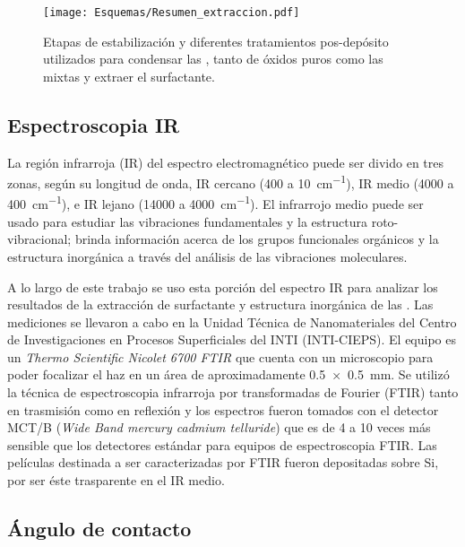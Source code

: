 				\begin{figure}[ht!]
						  \begin{center}
						  \texttt{[image: Esquemas/Resumen\_extraccion.pdf]}
						  \caption[Tratamientos pos-depósito de \pdm]{Etapas de estabilización y diferentes tratamientos pos-depósito utilizados para condensar las \pdm\space, tanto de óxidos puros como las mixtas y extraer el surfactante.}
						  \label{esq:peliculas_meso_tratamientos}
						  \end{center}
						  \end{figure}

	\pagebreak \subsection{Espectroscopia IR}\label{sec:IR}

		La región infrarroja (IR) del espectro electromagnético puede ser divido en tres zonas, según su longitud de onda, IR cercano (400 a \SI{10}{\cm^{-1}}), IR medio (4000 a \SI{400}{\cm^{-1}}), e IR lejano (14000 a \SI{4000}{\cm^{-1}}). El infrarrojo medio puede ser usado para estudiar las vibraciones fundamentales y la estructura roto-vibracional; brinda información acerca de los grupos funcionales orgánicos y la estructura inorgánica a través del análisis de las vibraciones moleculares.\cite{Atkins2006,Barrow1962,Stuart2004} 
		
		A lo largo de este trabajo se uso esta porción del espectro IR para analizar los resultados de la extracción de surfactante y estructura inorgánica de las \pdm. Las mediciones se llevaron a cabo en la Unidad Técnica de Nanomateriales del Centro de Investigaciones en Procesos Superficiales del INTI (INTI-CIEPS). El equipo es un \textit{Thermo Scientific Nicolet 6700 FTIR} que cuenta con un microscopio para poder focalizar el haz en un área de aproximadamente \SI{0.5x0.5}{\mm}. Se utilizó la técnica de espectroscopia infrarroja por transformadas de Fourier (FTIR) tanto en trasmisión como en reflexión y los espectros fueron tomados con el detector MCT/B (\textit{Wide Band mercury cadmium telluride}) que es de 4 a 10 veces más sensible que los detectores estándar para equipos de espectroscopia FTIR.\cite{Nicholet2007} Las películas destinada a ser caracterizadas por FTIR fueron depositadas sobre Si, por ser éste trasparente en el IR medio.

	\subsection{Ángulo de contacto}

